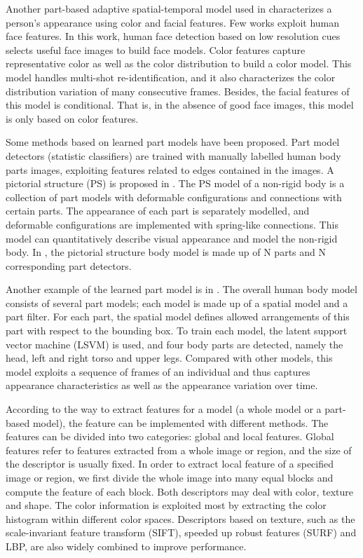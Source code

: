 \indent Another part-based adaptive spatial-temporal model used in \cite{PartbasedSTReid} characterizes a person's appearance using color and facial features. Few works exploit human face features. In this work, human face detection based on low resolution cues selects useful face images to build face models. Color features capture representative color as well as the color distribution to build a color model. This model handles multi-shot re-identification, and it also characterizes the color distribution variation of many consecutive frames.  Besides, the facial features of this model is conditional. That is, in the absence of good face images, this model is only based on color features.

Some methods based on learned part models have been proposed. Part model detectors (statistic classifiers) are trained with manually labelled human body parts images, exploiting features related to edges contained in the images. A pictorial structure (PS) is proposed in \cite{PictorialModel}. The PS model of a non-rigid body is a collection of part models with deformable configurations and connections with certain parts. The appearance of each part is separately modelled, and deformable configurations are implemented with spring-like connections. This model can quantitatively describe visual appearance and model the non-rigid body. In \cite{PSmodelRevisit}, the pictorial structure body model is made up of N parts and N corresponding part detectors. 

Another example of the learned part model is in \cite{MultiPersonREID, PartbasedSTReid}. The overall human body model consists of several part models; each model is made up of a spatial model and a part filter. For each part, the spatial model defines allowed arrangements of this part with respect to the bounding box. To train each model, the latent support vector machine (LSVM) is used, and four body parts are detected, namely the head, left and right torso and upper legs. Compared with other models, this model exploits a sequence of frames of an individual and thus captures appearance characteristics as well as the appearance variation over time.

According to the way to extract features for a model (a whole model or a part-based model), the feature can be implemented with different methods. The features can be divided into two categories: global and local features. Global features refer to features extracted from a whole image or region, and the size of the descriptor is usually fixed. In order to extract local feature of a specified image or region, we first divide the whole image into many equal blocks and compute the feature of each block.  Both descriptors may deal with color, texture and shape. The color information is exploited most by extracting the color histogram within different color spaces. Descriptors based on texture, such as the scale-invariant feature transform (SIFT), speeded up robust features (SURF) and LBP, are also widely combined to improve performance.

